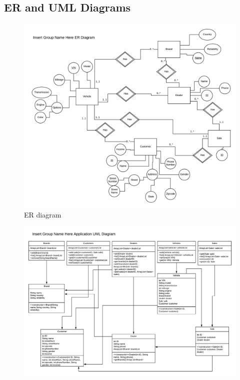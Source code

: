 \documentclass{math}
\begin{document}
\subsection*{ER and UML Diagrams}
\begin{figure}[H]
  \centering
  \includegraphics[width=20cm]{assets/phase2_er_diagram.png}
  \caption{ER diagram}
\end{figure}
\begin{figure}[H]
  \centering
  \includegraphics[width=20cm]{assets/phase2_uml_diagram.png}
\end{figure}
\end{document}
